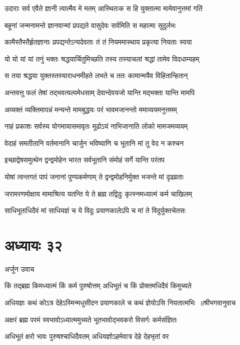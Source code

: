 \twolineshloka
{उदाराः सर्व एवैते ज्ञानी त्वात्मैव मे मतम्}
{आस्थितःक स हि युक्तात्मा मामेवानुत्तमां गतिं}


\twolineshloka
{बहूनां जन्मनामन्ते ज्ञानवान्मां प्रपद्यते}
{वासुदेवः सर्वमिति स महात्मा सुदुर्लभः}


\twolineshloka
{कामैस्तैस्तैर्हृतज्ञानाः प्रपद्यन्तेऽन्यदेवताः}
{तं तं नियममास्थाय प्रकृत्या नियताः स्वया}


\twolineshloka
{यो यो यां यां तनुं भक्तः श्रद्धयार्चितुमिच्छति}
{तस्य तस्याचलां श्रद्धां तामेव विदधाम्यहम्}


\twolineshloka
{स तया श्रद्धया युक्तस्तस्याराधनमीहते}
{लभते च ततः कामान्मयैव विहितान्हितान्}


\twolineshloka
{अन्तवत्तु फलं तेषां तद्भवत्यल्पमेधसाम्}
{देवान्देवयजो यान्ति मद्भक्ता यान्ति मामपि}


\twolineshloka
{अव्यक्तं व्यक्तिमापन्नं मन्यन्ते मामबुद्धयः}
{परं भावमजानन्तो ममाव्ययमनुत्तमम्}


\twolineshloka
{नाहं प्रकाशः सर्वस्य योगमायासमावृतः}
{मूढोऽयं नाभिजानाति लोको मामजमव्ययम्}


\twolineshloka
{वेदाहं समतीतानि वर्तमानानि चार्जुन}
{भविष्याणि च भूतानि मां तु वेद न कश्चन}


\twolineshloka
{इच्छाद्वेषसमुत्थेन द्वन्द्वमोहेन भारत}
{सर्वभूतानि संमोहं सर्गे यान्ति परंतप}


\twolineshloka
{योषां त्वन्तगतं पापं जनानां पुण्यकर्मणाम्}
{ते द्वन्द्वमोहनिर्मुक्त भजन्ते मां दृढव्रताः}


\twolineshloka
{जरामरणमोक्षाय मामाश्रित्य यतन्ति ये}
{ते ब्रह्म तद्विदुः कृत्स्नमध्यात्मं कर्म चाखिलम्}


\twolineshloka
{साधिभूताधिदैवं मां साधियज्ञं च ये विदुः}
{प्रयाणकालेऽपि च मां ते विदुर्युक्तचेतसः}


\chapter{अध्यायः ३२}
\twolineshloka
{अर्जुन उवाच}
{}


\twolineshloka
{किं तद्ब्रह्म किमध्यात्मं किं कर्म पुरुषोत्तम्}
{अधिभूतं च किं प्रोक्तमधिदैवं किमुच्यते}


\threelineshloka
{अधियज्ञः कथं कोऽत्र देहेऽस्मिन्मधुसीदन}
{प्रयाणकाले च कथं ज्ञेयोऽसि नियतात्मभिः ॥श्रीभगवानुवाच}
{}


\twolineshloka
{अक्षरं ब्रह्म परमं स्वभावोऽध्यात्ममुच्यते}
{भूतभावोद्भवकरो विसर्गः कर्मसंज्ञितः}


\twolineshloka
{अधिभूतं क्षरो भावः पुरुषश्चाधिदैवतम्}
{अधियज्ञोऽहमेवात्र देहे देहभृतां वर}


